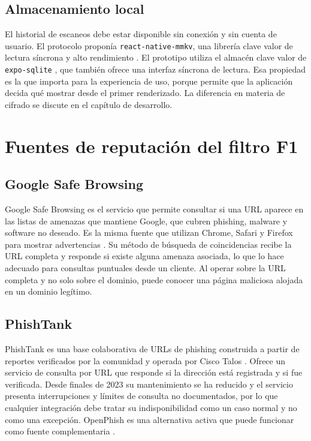 \subsection{Almacenamiento local}

El historial de escaneos debe estar disponible sin conexión y sin cuenta de usuario. El protocolo proponía \texttt{react-native-mmkv}, una librería clave valor de lectura síncrona y alto rendimiento \cite{rousavy_mmkv,rousavy_storagebenchmark}. El prototipo utiliza el almacén clave valor de \texttt{expo-sqlite} \cite{expo_sqlite}, que también ofrece una interfaz síncrona de lectura. Esa propiedad es la que importa para la experiencia de uso, porque permite que la aplicación decida qué mostrar desde el primer renderizado. La diferencia en materia de cifrado se discute en el capítulo de desarrollo.

\section{Fuentes de reputación del filtro F1}

\subsection{Google Safe Browsing}

Google Safe Browsing es el servicio que permite consultar si una URL aparece en las listas de amenazas que mantiene Google, que cubren phishing, malware y software no deseado. Es la misma fuente que utilizan Chrome, Safari y Firefox para mostrar advertencias \cite{google_safebrowsing}. Su método de búsqueda de coincidencias recibe la URL completa y responde si existe alguna amenaza asociada, lo que lo hace adecuado para consultas puntuales desde un cliente. Al operar sobre la URL completa y no solo sobre el dominio, puede conocer una página maliciosa alojada en un dominio legítimo.

\subsection{PhishTank}

PhishTank es una base colaborativa de URLs de phishing construida a partir de reportes verificados por la comunidad y operada por Cisco Talos \cite{phishtank_devinfo}. Ofrece un servicio de consulta por URL que responde si la dirección está registrada y si fue verificada. Desde finales de 2023 su mantenimiento se ha reducido y el servicio presenta interrupciones y límites de consulta no documentados, por lo que cualquier integración debe tratar su indisponibilidad como un caso normal y no como una excepción. OpenPhish es una alternativa activa que puede funcionar como fuente complementaria \cite{openphish}.

